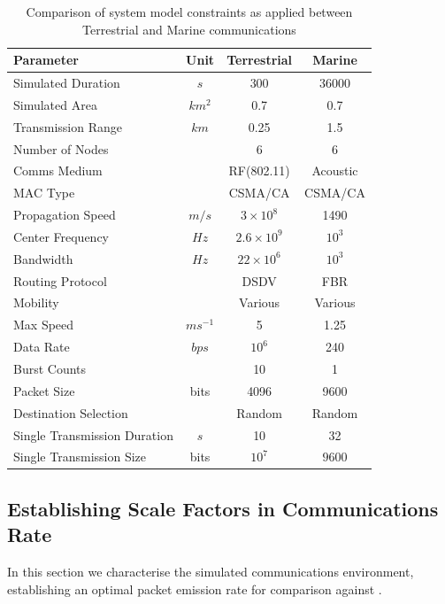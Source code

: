 \documentclass[runningheads,a4paper]{llncs}
\begin{document}
\begin{table}[h]
  \caption{Comparison of system model constraints as applied between Terrestrial and Marine communications} \label{tab:sysconstraints}
  \begin{center}
    \setlength{\tabcolsep}{8pt}
    \begin{tabular}{|l|c|c|c|}
      \hline
      Parameter & Unit & Terrestrial & Marine \\
      \hline
      Simulated Duration & $s$ & 300 & 36000\\
      Simulated Area & $km^2$ & 0.7 & 0.7 \\
      Transmission Range & $km$ & 0.25 & 1.5 \\
      Number of Nodes & & 6 & 6 \\
      Comms Medium & & RF(802.11) & Acoustic\\
      MAC Type & & CSMA/CA & CSMA/CA\\
      Propagation Speed& $m/s$ & $3\times10^8$ & 1490\\
      Center Frequency& $Hz$ & $2.6\times10^9$ & $10^3$ \\
      Bandwidth& $Hz$ & $22\times10^6$ & $10^3$\\
      Routing Protocol & & DSDV & FBR \\
      Mobility & & Various & Various \\
      Max Speed & $ms^{-1}$ & 5 & 1.25 \\
      Data Rate & $bps$ & $10^6$ & 240 \\
      Burst Counts & & 10 & 1 \\
      Packet Size & bits & 4096 & 9600 \\
      Destination Selection & & Random & Random\\
      Single Transmission Duration & $s$ & 10 & 32 \\
      Single Transmission Size & bits & $10^7$ & $9600$ \\
      \hline
    \end{tabular}
    \setlength{\tabcolsep}{6pt}
  \end{center}
\end{table}


\subsection{Establishing Scale Factors in Communications Rate}

In this section we characterise the simulated communications environment, establishing an optimal packet emission rate for comparison against \cite{Guo11}. 
\end{document}
